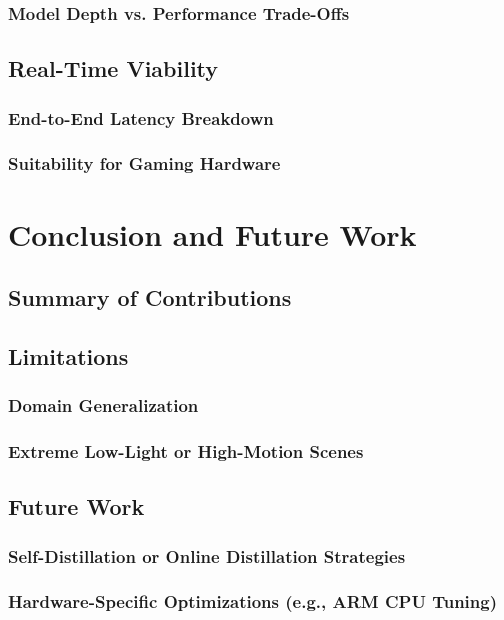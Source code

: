 \documentclass[a4paper,12pt]{report}
\begin{document}
\subsection{Model Depth vs. Performance Trade-Offs}

\section{Real-Time Viability}
\subsection{End-to-End Latency Breakdown}
\subsection{Suitability for Gaming Hardware}

\chapter{Conclusion and Future Work}
\section{Summary of Contributions}
\section{Limitations}
\subsection{Domain Generalization}
\subsection{Extreme Low-Light or High-Motion Scenes}

\section{Future Work}
\subsection{Self-Distillation or Online Distillation Strategies}
\subsection{Hardware-Specific Optimizations (e.g., ARM CPU Tuning)}
\end{document}
